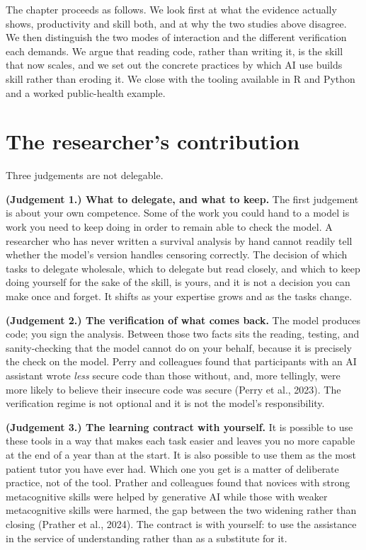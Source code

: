 \documentclass[
  letterpaper,
  11pt]{scrbook}
\begin{document}
The chapter proceeds as follows. We look first at what the evidence
actually shows, productivity and skill both, and at why the two studies
above disagree. We then distinguish the two modes of interaction and the
different verification each demands. We argue that reading code, rather
than writing it, is the skill that now scales, and we set out the
concrete practices by which AI use builds skill rather than eroding it.
We close with the tooling available in R and Python and a worked
public-health example.

\section{The researcher's contribution}\label{sec-ai-programming-human}

Three judgements are not delegable.

\textbf{(Judgement 1.) What to delegate, and what to keep.} The first
judgement is about your own competence. Some of the work you could hand
to a model is work you need to keep doing in order to remain able to
check the model. A researcher who has never written a survival analysis
by hand cannot readily tell whether the model's version handles
censoring correctly. The decision of which tasks to delegate wholesale,
which to delegate but read closely, and which to keep doing yourself for
the sake of the skill, is yours, and it is not a decision you can make
once and forget. It shifts as your expertise grows and as the tasks
change.

\textbf{(Judgement 2.) The verification of what comes back.} The model
produces code; you sign the analysis. Between those two facts sits the
reading, testing, and sanity-checking that the model cannot do on your
behalf, because it is precisely the check on the model. Perry and
colleagues found that participants with an AI assistant wrote
\emph{less} secure code than those without, and, more tellingly, were
more likely to believe their insecure code was secure (Perry et al.,
2023). The verification regime is not optional and it is not the model's
responsibility.

\textbf{(Judgement 3.) The learning contract with yourself.} It is
possible to use these tools in a way that makes each task easier and
leaves you no more capable at the end of a year than at the start. It is
also possible to use them as the most patient tutor you have ever had.
Which one you get is a matter of deliberate practice, not of the tool.
Prather and colleagues found that novices with strong metacognitive
skills were helped by generative AI while those with weaker
metacognitive skills were harmed, the gap between the two widening
rather than closing ({Prather et al.}, 2024). The contract is with
yourself: to use the assistance in the service of understanding rather
than as a substitute for it.
\end{document}
